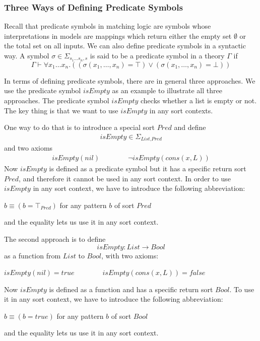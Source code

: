 \documentclass[UTF8,11pt]{article}
\theoremstyle{plain}
\theoremstyle{definition}
\theoremstyle{remark}
\newcommand{\Bool}{\textit{Bool}}
\newcommand{\List}{\textit{List}}
\newcommand{\nil}{\textit{nil}}
\newcommand{\cons}{\textit{cons}}
\newcommand{\ittrue}{\textit{true}}
\newcommand{\itfalse}{\textit{false}}
\newcommand{\Pred}{\textit{Pred}}
\newcommand{\isEmpty}{\textit{isEmpty}}
\begin{document}
\subsubsection{Three Ways of Defining Predicate Symbols}
\label{sec:three-ways-of-defining-predicate-symbols}
Recall that predicate symbols in matching logic are symbols whose 
interpretations in models are mappings which return either the empty set 
$\emptyset$ or the total set on all inputs.
We can also define predicate symbols in a syntactic way.
A symbol $\sigma \in \Sigma_{s_1\ldots s_n,s}$ is said to be a predicate symbol 
in a theory $\Gamma$ if
$$ \Gamma \vdash \forall x_1 \dots x_n . ((\sigma(x_1,\dots,x_n) = \top) \vee  
(\sigma(x_1,\dots,x_n) = \bot))$$

In terms of defining predicate symbols, there are in general three approaches.
We use the predicate symbol $\isEmpty$ as an example to illustrate all three 
approaches.
The predicate symbol $\isEmpty$ checks whether a list is empty or not.
The key thing is that we want to use $\isEmpty$ in any sort contexts.

One way to do that is to introduce a special sort $\Pred$ and define
\begin{align*}
 \isEmpty \in \Sigma_{\List,\Pred}
\end{align*}
and two axioms
\begin{align*}
\isEmpty(\nil) \qquad\qquad \neg \isEmpty(\cons(x,L))
\end{align*}
Now $\isEmpty$ is defined as a predicate symbol but it has a specific return 
sort $\Pred$, and therefore it cannot be used in any sort context.
In order to use $\isEmpty$ in any sort context, we have to introduce the 
following abbreviation:
\begin{center}
	$b \equiv (b = \top_\Pred)$ \qquad for any pattern $b$ of sort $\Pred$
\end{center}
and the equality lets us use it in any sort context.

The second approach is to define
$$ \isEmpty \colon \List \to \Bool $$
as a function from $\List$ to $\Bool$, with two axioms:
\begin{center}
	$isEmpty(\nil)=\ittrue \qquad\qquad \isEmpty(\cons(x,L)) = \itfalse$
\end{center}
Now $\isEmpty$ is defined as a function and has a specific return sort $\Bool$.
To use it in any sort context, we have to introduce the following abbreviation:
\begin{center}
	$b \equiv (b = \ittrue)$ \qquad for any pattern $b$ of sort $\Bool$
\end{center}
and the equality lets us use it in any sort context.
\end{document}
